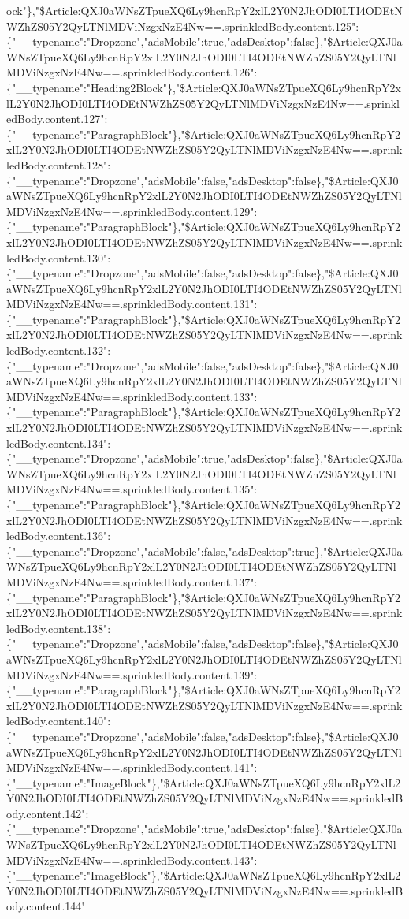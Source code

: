 ock"\},"\$Article:QXJ0aWNsZTpueXQ6Ly9hcnRpY2xlL2Y0N2JhODI0LTI4ODEtNWZhZS05Y2QyLTNlMDViNzgxNzE4Nw==.sprinkledBody.content.125":\{"\_\_typename":"Dropzone","adsMobile":true,"adsDesktop":false\},"\$Article:QXJ0aWNsZTpueXQ6Ly9hcnRpY2xlL2Y0N2JhODI0LTI4ODEtNWZhZS05Y2QyLTNlMDViNzgxNzE4Nw==.sprinkledBody.content.126":\{"\_\_typename":"Heading2Block"\},"\$Article:QXJ0aWNsZTpueXQ6Ly9hcnRpY2xlL2Y0N2JhODI0LTI4ODEtNWZhZS05Y2QyLTNlMDViNzgxNzE4Nw==.sprinkledBody.content.127":\{"\_\_typename":"ParagraphBlock"\},"\$Article:QXJ0aWNsZTpueXQ6Ly9hcnRpY2xlL2Y0N2JhODI0LTI4ODEtNWZhZS05Y2QyLTNlMDViNzgxNzE4Nw==.sprinkledBody.content.128":\{"\_\_typename":"Dropzone","adsMobile":false,"adsDesktop":false\},"\$Article:QXJ0aWNsZTpueXQ6Ly9hcnRpY2xlL2Y0N2JhODI0LTI4ODEtNWZhZS05Y2QyLTNlMDViNzgxNzE4Nw==.sprinkledBody.content.129":\{"\_\_typename":"ParagraphBlock"\},"\$Article:QXJ0aWNsZTpueXQ6Ly9hcnRpY2xlL2Y0N2JhODI0LTI4ODEtNWZhZS05Y2QyLTNlMDViNzgxNzE4Nw==.sprinkledBody.content.130":\{"\_\_typename":"Dropzone","adsMobile":false,"adsDesktop":false\},"\$Article:QXJ0aWNsZTpueXQ6Ly9hcnRpY2xlL2Y0N2JhODI0LTI4ODEtNWZhZS05Y2QyLTNlMDViNzgxNzE4Nw==.sprinkledBody.content.131":\{"\_\_typename":"ParagraphBlock"\},"\$Article:QXJ0aWNsZTpueXQ6Ly9hcnRpY2xlL2Y0N2JhODI0LTI4ODEtNWZhZS05Y2QyLTNlMDViNzgxNzE4Nw==.sprinkledBody.content.132":\{"\_\_typename":"Dropzone","adsMobile":false,"adsDesktop":false\},"\$Article:QXJ0aWNsZTpueXQ6Ly9hcnRpY2xlL2Y0N2JhODI0LTI4ODEtNWZhZS05Y2QyLTNlMDViNzgxNzE4Nw==.sprinkledBody.content.133":\{"\_\_typename":"ParagraphBlock"\},"\$Article:QXJ0aWNsZTpueXQ6Ly9hcnRpY2xlL2Y0N2JhODI0LTI4ODEtNWZhZS05Y2QyLTNlMDViNzgxNzE4Nw==.sprinkledBody.content.134":\{"\_\_typename":"Dropzone","adsMobile":true,"adsDesktop":false\},"\$Article:QXJ0aWNsZTpueXQ6Ly9hcnRpY2xlL2Y0N2JhODI0LTI4ODEtNWZhZS05Y2QyLTNlMDViNzgxNzE4Nw==.sprinkledBody.content.135":\{"\_\_typename":"ParagraphBlock"\},"\$Article:QXJ0aWNsZTpueXQ6Ly9hcnRpY2xlL2Y0N2JhODI0LTI4ODEtNWZhZS05Y2QyLTNlMDViNzgxNzE4Nw==.sprinkledBody.content.136":\{"\_\_typename":"Dropzone","adsMobile":false,"adsDesktop":true\},"\$Article:QXJ0aWNsZTpueXQ6Ly9hcnRpY2xlL2Y0N2JhODI0LTI4ODEtNWZhZS05Y2QyLTNlMDViNzgxNzE4Nw==.sprinkledBody.content.137":\{"\_\_typename":"ParagraphBlock"\},"\$Article:QXJ0aWNsZTpueXQ6Ly9hcnRpY2xlL2Y0N2JhODI0LTI4ODEtNWZhZS05Y2QyLTNlMDViNzgxNzE4Nw==.sprinkledBody.content.138":\{"\_\_typename":"Dropzone","adsMobile":false,"adsDesktop":false\},"\$Article:QXJ0aWNsZTpueXQ6Ly9hcnRpY2xlL2Y0N2JhODI0LTI4ODEtNWZhZS05Y2QyLTNlMDViNzgxNzE4Nw==.sprinkledBody.content.139":\{"\_\_typename":"ParagraphBlock"\},"\$Article:QXJ0aWNsZTpueXQ6Ly9hcnRpY2xlL2Y0N2JhODI0LTI4ODEtNWZhZS05Y2QyLTNlMDViNzgxNzE4Nw==.sprinkledBody.content.140":\{"\_\_typename":"Dropzone","adsMobile":false,"adsDesktop":false\},"\$Article:QXJ0aWNsZTpueXQ6Ly9hcnRpY2xlL2Y0N2JhODI0LTI4ODEtNWZhZS05Y2QyLTNlMDViNzgxNzE4Nw==.sprinkledBody.content.141":\{"\_\_typename":"ImageBlock"\},"\$Article:QXJ0aWNsZTpueXQ6Ly9hcnRpY2xlL2Y0N2JhODI0LTI4ODEtNWZhZS05Y2QyLTNlMDViNzgxNzE4Nw==.sprinkledBody.content.142":\{"\_\_typename":"Dropzone","adsMobile":true,"adsDesktop":false\},"\$Article:QXJ0aWNsZTpueXQ6Ly9hcnRpY2xlL2Y0N2JhODI0LTI4ODEtNWZhZS05Y2QyLTNlMDViNzgxNzE4Nw==.sprinkledBody.content.143":\{"\_\_typename":"ImageBlock"\},"\$Article:QXJ0aWNsZTpueXQ6Ly9hcnRpY2xlL2Y0N2JhODI0LTI4ODEtNWZhZS05Y2QyLTNlMDViNzgxNzE4Nw==.sprinkledBody.content.144"
